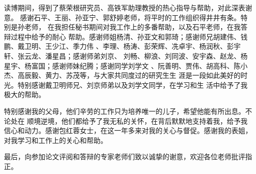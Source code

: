 读博期间，得到了蔡荣根研究员、高铁军助理教授的热心指导与帮助，对此深表谢意。
感谢石平、王丽、孙亚宁、郭舒婷老师，将平时的工作组织得井井有条。特别是孙老师，
在我担任秘书期间对我工作上的多番帮助，以及石平老师，在我答辩过程中给予的耐心
帮助。感谢师姐杨清、孙亚文和郭琦；感谢师兄胡建伟、钱鹏、戴卫明、王少江、季力伟
、李理、杨涛、彭荣辉、冼卓宇、杨润秋、彭宇轩、张云龙、潘星昌；感谢师弟刘京、
刘畅、柳浪、刘同波、安宇森、赵龙、杨星宇、杨富国；感谢师妹纪腾；感谢同学刘学文
、阮善明、贾伟、胡高科、陈小杰、高辰毅、黄力、苏茂等，与大家共同度过的研究生生
涯是一段如此美好的时光。特别感谢戴卫明师兄、刘京师弟以及刘学文同学，在学习和生
活中给予了我极大的帮助。

特别感谢我的父母，他们辛劳的工作只为培养唯一的儿子，希望他能有所出息。不论处在
顺境逆境，他们都给予了我无私的关怀，在背后默默地支持着我，给予我信心和动力。感谢包红蓉女士，在这一年多来对我的关心与督促。感谢我的表姐，对我学习和工作上的关心和帮助。

最后，向参加论文评阅和答辩的专家老师们致以诚挚的谢意，欢迎各位老师批评指正。

\cleardoublepage[plain]%

